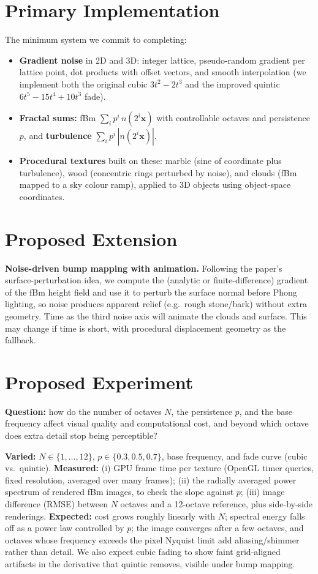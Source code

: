\documentclass[acmlarge,nonacm]{acmart}
\begin{document}
\section{Primary Implementation}\label{sec:primary}
The minimum system we commit to completing:
\begin{itemize}
\item \textbf{Gradient noise} in 2D and 3D: integer lattice, pseudo-random gradient per lattice point, dot products with offset vectors, and smooth interpolation (we implement both the original cubic $3t^2-2t^3$ and the improved quintic $6t^5-15t^4+10t^3$ fade).
\item \textbf{Fractal sums:} fBm $\sum_i p^i\,n(2^i\mathbf{x})$ with controllable octaves and persistence $p$, and \textbf{turbulence} $\sum_i p^i\,|n(2^i\mathbf{x})|$.
\item \textbf{Procedural textures} built on these: marble (sine of coordinate plus turbulence), wood (concentric rings perturbed by noise), and clouds (fBm mapped to a sky colour ramp), applied to 3D objects using object-space coordinates.
\end{itemize}

\section{Proposed Extension}\label{sec:ext}
\textbf{Noise-driven bump mapping with animation.} Following the paper's surface-perturbation idea, we compute the (analytic or finite-difference) gradient of the fBm height field and use it to perturb the surface normal before Phong lighting, so noise produces apparent relief (e.g.\ rough stone/bark) without extra geometry. Time as the third noise axis will animate the clouds and surface. This may change if time is short, with procedural displacement geometry as the fallback.

\section{Proposed Experiment}\label{sec:exp}
\textbf{Question:} how do the number of octaves $N$, the persistence $p$, and the base frequency affect visual quality and computational cost, and beyond which octave does extra detail stop being perceptible?

\textbf{Varied:} $N\in\{1,\dots,12\}$, $p\in\{0.3,0.5,0.7\}$, base frequency, and fade curve (cubic vs.\ quintic). \textbf{Measured:} (i) GPU frame time per texture (OpenGL timer queries, fixed resolution, averaged over many frames); (ii) the radially averaged power spectrum of rendered fBm images, to check the slope against $p$; (iii) image difference (RMSE) between $N$ octaves and a 12-octave reference, plus side-by-side renderings. \textbf{Expected:} cost grows roughly linearly with $N$; spectral energy falls off as a power law controlled by $p$; the image converges after a few octaves, and octaves whose frequency exceeds the pixel Nyquist limit add aliasing/shimmer rather than detail. We also expect cubic fading to show faint grid-aligned artifacts in the derivative that quintic removes, visible under bump mapping.
\end{document}

